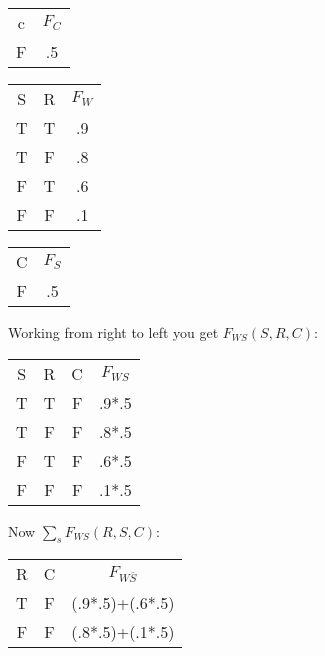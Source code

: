 \documentclass[12pt]{article}
\begin{document}
\begin{table}[h!]
  \begin{tabular}{|c|c|}
    \hline
    c & $F_C$ \\
    F & .5 \\
    \hline 
  \end{tabular}
\end{table}

\begin{table}[h!]
  \begin{tabular}{|c|c|c|}
    \hline
    S & R & $F_W$ \\
    T & T & .9 \\
    T & F & .8 \\
    F & T & .6 \\
    F & F & .1 \\
    \hline 
  \end{tabular}
\end{table}

\begin{table}[h!]
  \begin{tabular}{|c|c|}
    \hline
    C & $F_S$ \\
    F & .5 \\
    \hline 
  \end{tabular}
\end{table}

Working from right to left you get $F_{WS}(S,R,C)$: 
\begin{table}[h!]
  \begin{tabular}{|c|c|c|c|}
    \hline
    S & R & C & $F_{WS}$ \\
    T & T & F & .9*.5 \\
    T & F & F & .8*.5 \\
    F & T & F & .6*.5 \\
    F & F & F & .1*.5 \\
    \hline 
  \end{tabular}
\end{table}

Now $\sum_s F_{WS}(R,S,C):$

\begin{table}[h!]
  \begin{tabular}{|c|c|c|}
    \hline
    R & C & $F_{W\bar{S}}$ \\
    T & F & (.9*.5)+(.6*.5) \\
    F & F & (.8*.5)+(.1*.5) \\
    \hline 
  \end{tabular}
\end{table}
\end{document}
